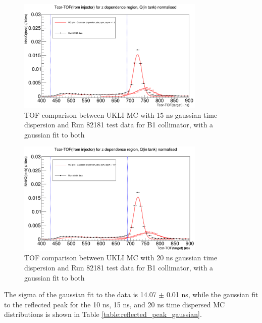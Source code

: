\begin{figure}
    \centering
    \includegraphics[width=0.8\textwidth]{Figures/15ns_gaussian_dispersion_with_fit.PNG}
    \caption{TOF comparison between UKLI MC with 15 ns gaussian time dispersion and Run 82181 test data for B1 collimator, with a gaussian fit to both}
    \label{fig:15ns_time_dispersion}
\end{figure}

\begin{figure}
    \centering
    \includegraphics[width=0.8\textwidth]{Figures/20ns_gaussian_dispersion_with_fit.PNG}
    \caption{TOF comparison between UKLI MC with 20 ns gaussian time dispersion and Run 82181 test data for B1 collimator, with a gaussian fit to both}
    \label{fig:20ns_time_dispersion}
\end{figure}


The sigma of the gaussian fit to the data is 14.07 $\pm$ 0.01 ns, while the gaussian fit to the reflected peak for the 10 ns, 15 ns, and 20 ns time dispersed MC distributions is shown in Table \ref{table:reflected_peak_gaussian}. 

